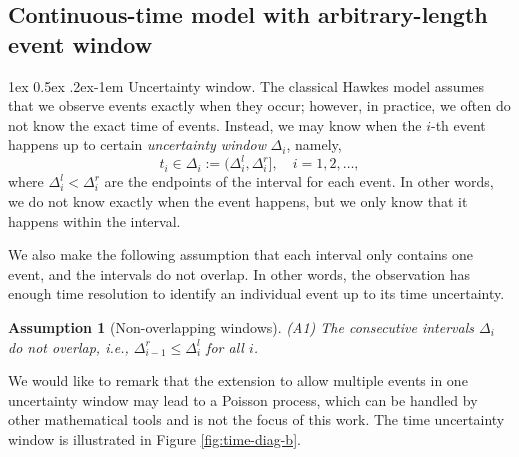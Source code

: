 \documentclass[11pt]{article}
\makeatletter
\newtheorem{assumption}{Assumption}
\theoremstyle{remark}
\theoremstyle{plain}
\renewcommand{\paragraph}{%
  \@startsection{paragraph}{4}%
  {\z@}{1ex \@plus 0.5ex \@minus .2ex}{-1em}%
  {\normalfont\normalsize\itshape}%
}
\makeatother
\begin{document}
\subsection{Continuous-time model with arbitrary-length event window}\label{subsec:cont-time-time-only}



\paragraph{Uncertainty window.}
The classical Hawkes model assumes that we observe events exactly when they occur; however, in practice, we often do not know the exact time of events.
Instead, we may know when the $i$-th event happens up to certain {\it uncertainty window} $\Delta_i$, namely,
\begin{equation}
    t_i \in \Delta_i := (\Delta_i^l, \Delta_i^r], \quad i = 1, 2, \ldots, \label{event_uq}
\end{equation}
where $\Delta_i^l< \Delta_i^r$ are the endpoints of the interval for each event. In other words, we do not know exactly when the event happens, but we only know that it happens within the interval.

We also make the following assumption that each interval only contains one event, and the intervals do not overlap. 
In other words, the observation has enough time resolution to identify an individual event up to its time uncertainty.

\begin{assumption}[Non-overlapping windows]\label{assump:disjoint_Delta} 
(A1)  The consecutive intervals $\Delta_i$ do not overlap, i.e., $\Delta_{i-1}^r \le \Delta_{i}^l$ for all $i$.
\end{assumption}
We would like to remark that the extension to allow multiple events in one uncertainty window may lead to a  Poisson process, which can be handled by other mathematical tools and is not the focus of this work. 
The time uncertainty window is illustrated in Figure \ref{fig:time-diag-b}.
\end{document}
